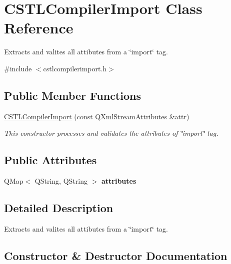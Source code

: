 \hypertarget{class_c_s_t_l_compiler_import}{}\section{C\+S\+T\+L\+Compiler\+Import Class Reference}
\label{class_c_s_t_l_compiler_import}


Extracts and valites all attibutes from a \char`\"{}import\char`\"{} tag.  




{\ttfamily \#include $<$cstlcompilerimport.\+h$>$}

\subsection*{Public Member Functions}
\begin{DoxyCompactItemize}
\item 
\mbox{\hyperlink{class_c_s_t_l_compiler_import_abf33061095db67280137700dd9c778fc}{C\+S\+T\+L\+Compiler\+Import}} (const Q\+Xml\+Stream\+Attributes \&attr)
\begin{DoxyCompactList}\small\item\em This constructor processes and validates the attributes of \char`\"{}import\char`\"{} tag. \end{DoxyCompactList}\end{DoxyCompactItemize}
\subsection*{Public Attributes}
\begin{DoxyCompactItemize}
\item 
\mbox{\label{class_c_s_t_l_compiler_import_a7a5f0f43548ad8f6dd24e3d8f2b5a19c}} 
Q\+Map$<$ Q\+String, Q\+String $>$ {\bfseries attributes}
\end{DoxyCompactItemize}


\subsection{Detailed Description}
Extracts and valites all attibutes from a \char`\"{}import\char`\"{} tag. 

\subsection{Constructor \& Destructor Documentation}
\mbox{\label{class_c_s_t_l_compiler_import_abf33061095db67280137700dd9c778fc}} 
